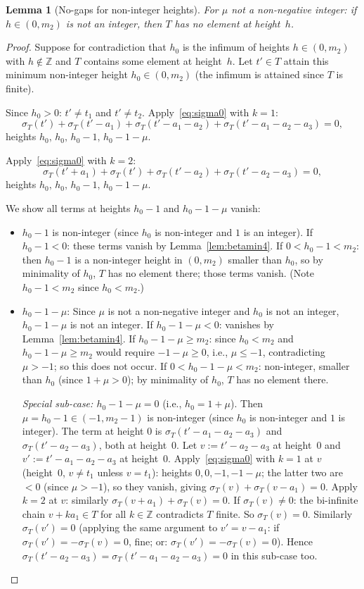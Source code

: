 \documentclass{article}
\newtheorem{lemma}{Lemma}
\begin{document}
\begin{lemma}[No-gaps for non-integer heights]\label{lem:nogaps}
For $\mu$ not a non-negative integer\textup{:}
if $h\in(0,m_2)$ is not an integer, then $T$ has no element at height~$h$.
\end{lemma}
\begin{proof}
Suppose for contradiction that $h_0$ is the infimum of heights $h\in(0,m_2)$ with $h\notin\mathbb{Z}$
and $T$ contains some element at height~$h$.  Let $t'\in T$ attain this minimum non-integer
height $h_0\in(0,m_2)$ (the infimum is attained since $T$ is finite).

Since $h_0>0$: $t'\ne t_1$ and $t'\ne t_2$.  Apply~\eqref{eq:sigma0} with $k=1$:
\[
  \sigma_T(t')+\sigma_T(t'-a_1)+\sigma_T(t'-a_1-a_2)+\sigma_T(t'-a_1-a_2-a_3)=0,
\]
heights $h_0,\,h_0,\,h_0-1,\,h_0-1-\mu$.

Apply~\eqref{eq:sigma0} with $k=2$:
\[
  \sigma_T(t'+a_1)+\sigma_T(t')+\sigma_T(t'-a_2)+\sigma_T(t'-a_2-a_3)=0,
\]
heights $h_0,\,h_0,\,h_0-1,\,h_0-1-\mu$.

We show all terms at heights $h_0-1$ and $h_0-1-\mu$ vanish:
\begin{itemize}
\item $h_0-1$ is non-integer (since $h_0$ is non-integer and $1$ is an integer).
  If $h_0-1<0$: these terms vanish by Lemma~\ref{lem:betamin4}.
  If $0<h_0-1<m_2$: then $h_0-1$ is a non-integer height in $(0,m_2)$ smaller than $h_0$,
  so by minimality of $h_0$, $T$ has no element there; those terms vanish.
  (Note $h_0-1<m_2$ since $h_0<m_2$.)

\item $h_0-1-\mu$: Since $\mu$ is not a non-negative integer and $h_0$ is not an integer,
  $h_0-1-\mu$ is not an integer.
  If $h_0-1-\mu<0$: vanishes by Lemma~\ref{lem:betamin4}.
  If $h_0-1-\mu\ge m_2$: since $h_0<m_2$ and $h_0-1-\mu\ge m_2$ would require $-1-\mu\ge 0$,
  i.e., $\mu\le -1$, contradicting $\mu>-1$; so this does not occur.
  If $0<h_0-1-\mu<m_2$: non-integer, smaller than $h_0$ (since $1+\mu>0$);
  by minimality of $h_0$, $T$ has no element there.

  \textit{Special sub-case: $h_0-1-\mu=0$} (i.e., $h_0=1+\mu$).
  Then $\mu=h_0-1\in(-1,m_2-1)$ is non-integer (since $h_0$ is non-integer and $1$ is integer).
  The term at height $0$ is $\sigma_T(t'-a_1-a_2-a_3)$ and $\sigma_T(t'-a_2-a_3)$,
  both at height~$0$.  Let $v:=t'-a_2-a_3$ at height~$0$ and $v':=t'-a_1-a_2-a_3$ at height~$0$.
  Apply~\eqref{eq:sigma0} with $k=1$ at $v$ (height~$0$, $v\ne t_1$ unless $v=t_1$):
  heights $0,0,-1,-1-\mu$; the latter two are $<0$ (since $\mu>-1$), so they vanish, giving
  $\sigma_T(v)+\sigma_T(v-a_1)=0$.
  Apply $k=2$ at $v$: similarly $\sigma_T(v+a_1)+\sigma_T(v)=0$.
  If $\sigma_T(v)\ne 0$: the bi-infinite chain $v+ka_1\in T$ for all $k\in\mathbb{Z}$
  contradicts $T$ finite.
  So $\sigma_T(v)=0$.  Similarly $\sigma_T(v')=0$
  (applying the same argument to $v'=v-a_1$: if $\sigma_T(v')=-\sigma_T(v)=0$, fine;
  or: $\sigma_T(v')=-\sigma_T(v)=0$).
  Hence $\sigma_T(t'-a_2-a_3)=\sigma_T(t'-a_1-a_2-a_3)=0$ in this sub-case too.
\end{itemize}


\end{proof}
\end{document}
